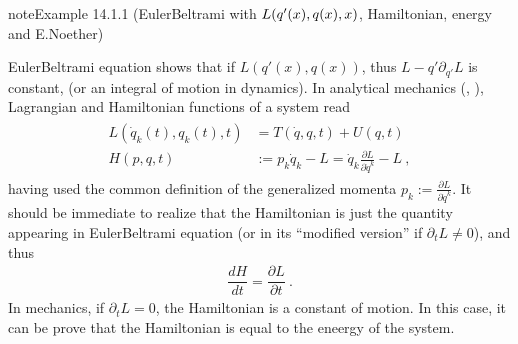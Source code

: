 \documentclass[letterpaper,10pt,english]{jupyterBook}
\begin{document}
\begin{sphinxadmonition}{note}{Example 14.1.1 (Euler\sphinxhyphen{}Beltrami with \protect\(L(q'(x),q(x),x)\protect\), Hamiltonian, energy and E.Noether)}



\sphinxAtStartPar
Euler\sphinxhyphen{}Beltrami equation shows that if \(L(q'(x), q(x))\), thus \(L - q' \partial_{q'} L\) is constant, (or an integral of motion in dynamics). In analytical mechanics (, ), Lagrangian and Hamiltonian functions of a system read
\begin{equation*}
\begin{split}\begin{aligned}
  L(\dot{q}_k(t), q_k(t), t) & = T(\dot{q},q,t) + U(q,t) \\
  H(p,q,t) & := p_k \dot{q}_k - L = \dot{q}_k \frac{\partial L}{\partial \dot{q}^k} - L \ ,
\end{aligned}\end{split}
\end{equation*}
\sphinxAtStartPar
having used the common definition of the generalized momenta \(p_k := \frac{\partial L}{\partial \dot{q}^k}\). It should be immediate to realize that the Hamiltonian is just the quantity appearing in Euler\sphinxhyphen{}Beltrami equation (or in its “modified version” if \(\partial_t L \ne 0\)), and thus
\begin{equation*}
\begin{split}\dfrac{d H}{d t} = \dfrac{\partial L}{\partial t} \ .\end{split}
\end{equation*}
\sphinxAtStartPar
In mechanics, if \(\partial_t L = 0\), the Hamiltonian is a constant of motion. In this case, it can be prove that the Hamiltonian is equal to the eneergy of the system.
\end{sphinxadmonition}
\end{document}
